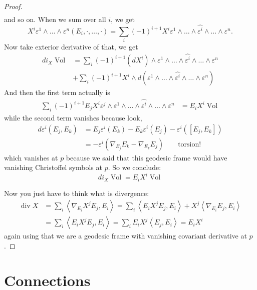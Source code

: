 \begin{proof}
\begin{align*}
\end{align*}
and so on. When we sum over all $i$, we get
$$
X^i\varepsilon^1\wedge\ldots\wedge\varepsilon^n(E_i,\cdot,\ldots,\cdot)
=\sum_{i}(-1)^{i+1}X^i\varepsilon^1\wedge\ldots\wedge\widehat{\varepsilon^i}
\wedge\ldots\wedge\varepsilon^n.
$$
Now take exterior derivative of that, we get
\begin{align*}
d i_X\operatorname{Vol}
&=\sum_i(-1)^{i+1}(dX^i)\wedge\varepsilon^1\wedge\ldots
\wedge\widehat{\varepsilon^i}\wedge\ldots\wedge\varepsilon^n\\
&+\sum_{i}(-1)^{i+1}X^i\wedge 
d(\varepsilon^1\wedge\ldots\wedge\widehat{\varepsilon^i}\wedge\ldots
\wedge\varepsilon^n)\end{align*}
And then the first term actually is
\begin{align*}
\sum_i(-1)^{i+1}E_jX^i\varepsilon^j\wedge\varepsilon^1\wedge\ldots
\wedge\widehat{\varepsilon^i}\wedge\ldots\wedge\varepsilon^n
&=E_iX^i\operatorname{Vol}
\end{align*}
while the second term vanishes because look,
\begin{align*}d \varepsilon^i(E_j,E_k)
&=E_j\varepsilon^i(E_k)-E_k\varepsilon^i(E_j)-\varepsilon^i([E_j,E_k])\\
&=-\varepsilon^i(\nabla_{E_j}E_k-\nabla_{E_k}E_j)\qquad \text{torsion!}
\end{align*}
which vanishes at $p$ because we said that this geodesic frame would have
 vanishing Christoffel symbols at $p$. So we conclude:
\[di_X \operatorname{Vol}=E_iX^i\operatorname{Vol}\]

Now you just have to think what is divergence:
\begin{align*}
\operatorname{div}X&=\sum_{i}\left<\nabla_{E_i}X^jE_j,E_i\right>
=\sum_{i}\left<E_iX^jE_j,E_i\right>+X^j\left<\nabla_{E_i}E_j,E_i\right>\\
&=\sum_i \left<E_iX^jE_j,E_i\right>=\sum_iE_iX^j\left<E_j,E_i\right>=E_iX^i
\end{align*}
again using that we are a geodesic frame with vanishing covariant 
derivative at $p$.
\end{proof}

















\section{Connections}
\label{section-connections}

